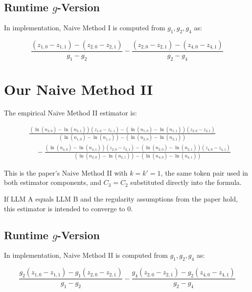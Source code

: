 \documentclass[11pt]{article}
\begin{document}
\subsection*{Runtime \(g\)-Version}

In implementation, Naive Method I is computed from \(g_1,g_2,g_4\) as:

\[
\boxed{
\frac{
    \left(z_{1,0}-z_{1,1}\right)-\left(z_{2,0}-z_{2,1}\right)
}{
    g_1-g_2
}
-
\frac{
    \left(z_{2,0}-z_{2,1}\right)-\left(z_{4,0}-z_{4,1}\right)
}{
    g_2-g_4
}
}
\]

\section{Our Naive Method II}

The empirical Naive Method II estimator is:

\[
\boxed{
\begin{aligned}
&
\frac{
    \left(\ln(n_{2,0})-\ln(n_{2,1})\right)
    \left(z_{1,0}-z_{1,1}\right)
    -
    \left(\ln(n_{1,0})-\ln(n_{1,1})\right)
    \left(z_{2,0}-z_{2,1}\right)
}{
    \left(\ln(n_{1,0})-\ln(n_{1,1})\right)
    -
    \left(\ln(n_{2,0})-\ln(n_{2,1})\right)
}
\\[1.25em]
&\quad -
\frac{
    \left(\ln(n_{4,0})-\ln(n_{4,1})\right)
    \left(z_{2,0}-z_{2,1}\right)
    -
    \left(\ln(n_{2,0})-\ln(n_{2,1})\right)
    \left(z_{4,0}-z_{4,1}\right)
}{
    \left(\ln(n_{2,0})-\ln(n_{2,1})\right)
    -
    \left(\ln(n_{4,0})-\ln(n_{4,1})\right)
}
\end{aligned}
}
\]

This is the paper's Naive Method II with \(k=k'=1\), the same token pair used in both estimator components, and \(C_3=C_2\) substituted directly into the formula.

If LLM A equals LLM B and the regularity assumptions from the paper hold, this estimator is intended to converge to \(0\).

\subsection*{Runtime \(g\)-Version}

In implementation, Naive Method II is computed from \(g_1,g_2,g_4\) as:

\[
\boxed{
\frac{
    g_2\left(z_{1,0}-z_{1,1}\right)
    -
    g_1\left(z_{2,0}-z_{2,1}\right)
}{
    g_1-g_2
}
-
\frac{
    g_4\left(z_{2,0}-z_{2,1}\right)
    -
    g_2\left(z_{4,0}-z_{4,1}\right)
}{
    g_2-g_4
}
}
\]
\end{document}
